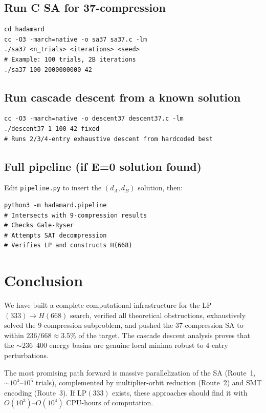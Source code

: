 \documentclass[11pt,a4paper]{article}
\theoremstyle{plain}
\theoremstyle{definition}
\theoremstyle{remark}
\begin{document}
\subsection{Run C SA for 37-compression}
\begin{lstlisting}
cd hadamard
cc -O3 -march=native -o sa37 sa37.c -lm
./sa37 <n_trials> <iterations> <seed>
# Example: 100 trials, 2B iterations
./sa37 100 2000000000 42
\end{lstlisting}

\subsection{Run cascade descent from a known solution}
\begin{lstlisting}
cc -O3 -march=native -o descent37 descent37.c -lm
./descent37 1 100 42 fixed
# Runs 2/3/4-entry exhaustive descent from hardcoded best
\end{lstlisting}

\subsection{Full pipeline (if E=0 solution found)}
Edit \texttt{pipeline.py} to insert the $(d_A,d_B)$ solution, then:
\begin{lstlisting}
python3 -m hadamard.pipeline
# Intersects with 9-compression results
# Checks Gale-Ryser
# Attempts SAT decompression
# Verifies LP and constructs H(668)
\end{lstlisting}

\section{Conclusion}

We have built a complete computational infrastructure for the LP$(333)\to H(668)$ search, verified all theoretical obstructions, exhaustively solved the $9$-compression subproblem, and pushed the $37$-compression SA to within $236/668\approx3.5\%$ of the target. The cascade descent analysis proves that the $\sim236$--$400$ energy basins are genuine local minima robust to $4$-entry perturbations.

The most promising path forward is massive parallelization of the SA (Route~1, $\sim10^4$--$10^5$ trials), complemented by multiplier-orbit reduction (Route~2) and SMT encoding (Route~3). If LP$(333)$ exists, these approaches should find it with $O(10^3)$--$O(10^4)$ CPU-hours of computation.
\end{document}
